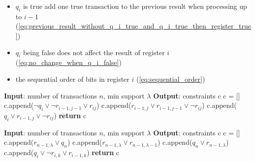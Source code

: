 \begin{itemize}
    \item $q_i$ is true add one true transaction to the previous result when processing up to $i-1$ (\ref{eq:previous_result_without_q_i_true_and_q_i_true_then_register_true})
    \item $q_i$ being false does not affect the result of register $i$ (\ref{eq:no_change_when_q_i_false})
    \item  the sequential order of bits in register $i$ (\ref{eq:sequential_order})
\end{itemize}

\begin{algorithm}
    \begin{algorithmic}[1]
        \State \textbf{Input}: number of transactions $n$, min support $\lambda$
        \State \textbf{Output}: constraints c
        \State c = []
        \State c.append($\neg q_i \vee \neg r_{i-1,j-1} \vee r_{ij}$)
        \State c.append($r_{i-1,j} \vee r_{i-1,j-1} \vee \neg r_{ij}$)
        \EndIf
        \State c.append($q_i \vee r_{i-1,j} \vee \neg r_{ij}$)
        \EndFor
        \EndFor
        \State \textbf{return} c
    \end{algorithmic}
\end{algorithm}

\begin{algorithm}
    \begin{algorithmic}[1]
        \State \textbf{Input}: number of transactions $n$, min support $\lambda$
        \State \textbf{Output}: constraints c
        \State c = []
        \State c.append($r_{n-1,\lambda} \vee q_n$)
        \State c.append($r_{n-1,\lambda} \vee r_{n-1,\lambda-1}$)
        \State c.append($q_n \vee r_{n-1,\lambda}$)
        \State c.append($q_i \vee \neg r_{i,k} \vee r_{i-1,k}$)
        \EndFor
        \State \textbf{return} c
    \end{algorithmic}
\end{algorithm}